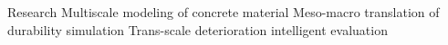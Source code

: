 
\begin{rubric}{Research}
\entry*[ ]
	Multiscale modeling of concrete material
\entry*[ ]
	Meso-macro translation of durability simulation
\entry*[ ]
	Trans-scale deterioration intelligent evaluation
\end{rubric}
